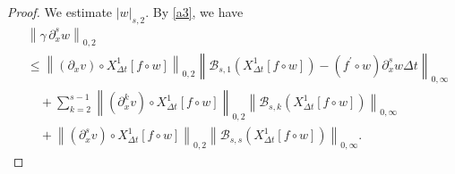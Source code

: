 \documentclass[10pt,a4paper,tbtags,leqno]{amsart}
\theoremstyle{definition}
\numberwithin{equation}{section}
\def\norm#1#2{\left\|#2\right\|_{#1}}
\def\snorm#1#2{\left|#2\right|_{#1}}
\begin{document}
\begin{proof}
  We estimate $ \snorm{s, 2}{w} $. By \eqref{a3}, we have 
  \begin{align} 
    & \norm{0, 2}{\gamma \, \partial_x^s w} \\ & \leq \norm{0, 2}{(\partial_x v) \circ {X_{\Delta t}^1}[f \circ w]} \norm{0, \infty}{\mathcal{B}_{s, 1} ({X_{\Delta t}^1} [f \circ w]) - (f^\prime \circ w) \partial_x^s w \Delta t} \\ 
    & \quad + \sum_{k = 2}^{s - 1} \norm{0, 2}{(\partial_x^k v) \circ {X_{\Delta t}^1}[f \circ w]} \norm{0, \infty}{\mathcal{B}_{s, k} ({X_{\Delta t}^1} [f \circ w])} \\
    & \quad + \norm{0, 2}{(\partial_x^s v) \circ {X_{\Delta t}^1}[f \circ w]} \norm{0, \infty}{\mathcal{B}_{s, s} ({X_{\Delta t}^1} [f \circ w])}. \label{a20} 
  \end{align} 


\end{proof}
\end{document}
